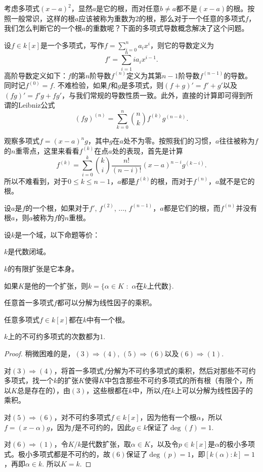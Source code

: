 考虑多项式$(x-a)^2$，显然$a$是它的根，而对任意$b\neq a$都不是$(x-a)$的根。按照一般常识，这样的根$a$应该被称为重数为$2$的根，那么对于一个任意的多项式$f$，我们怎么判断它的一个根$a$的重数呢？下面的多项式导数概念解决了这个问题。

\para 设$f\in k[x]$是一个多项式，写作$f=\sum_{i=0}^n a_ix^i$，则它的导数定义为
\[
	f'=\sum_{i=1}^n ia_ix^{i-1}.
\]
高阶导数定义如下：$f$的第$n$阶导数$f^{(n)}$定义为其第$n-1$阶导数$f^{(n-1)}$的导数。同时记$f^{(0)}=f$. 不难检验，如果$f$和$g$是多项式，则$(f+g)'=f'+g'$以及$(fg)'=f'g+fg'$，与我们常规的导数性质一致。此外，直接的计算即可得到所谓的Leibniz公式
\[
	(fg)^{(n)}=\sum_{k=0}^n {n \choose k}f^{(k)}g^{(n-k)}.
\]

观察多项式$f=(x-a)^ng$，其中$g$在$a$处不为零。按照我们的习惯，$a$往往被称为$f$的$n$重零点，这里来看看$f^{(k)}$在点$a$处的表现，首先是计算
\[
	f^{(k)}=\sum_{i=0}^k {k \choose i} \frac{n!}{(n-i)!}(x-a)^{n-i}g^{(k-i)}.
\]
所以不难看到，对于$0\leq k\leq n-1$，$a$都是$f^{(k)}$的根，而对于$f^{(n)}$，$a$就不是它的根。

\begin{para}
设$a$是$f$的一个根，如果对于$f'$, $f^{(2)}$, $\dots$, $f^{(n-1)}$，$a$都是它们的根，而$f^{(n)}$并没有根$a$，则$a$被称为$f$的$n$重根。
\end{para}

\begin{thm}设$k$是一个域，以下命题等价：
\begin{compactenum}[~~~(1)]
\item $k$是代数闭域。
\item $k$的有限扩张是它本身。
\item 如果$K$是他的一个扩张，则$k=\{\alpha\in K$ $:$ $\alpha$在$k$上代数$\}$.
\item 任意首一多项式$f$都可以分解为线性因子的乘积。
\item 任意多项式$f\in k[x]$都在$k$中有一个根。
\item $k$上的不可约多项式的次数都为$1$.
\end{compactenum}
\end{thm}

\begin{proof}
	稍微困难的是，$(3)\Rightarrow (4)$, $(5)\Rightarrow (6)$以及$(6)\Rightarrow (1)$.

	对$(3)\Rightarrow (4)$，将首一多项式$f$分解为不可约多项式的乘积，然后对那些不可约多项式，找一个$k$的扩张$K$使得$K$中包含那些不可约多项式的所有根（有限个，所以$K$总是存在的），由$(3)$，这些根都在$k$中，所以$f$在$k$上可以分解为线性因子的乘积。

	对$(5)\Rightarrow (6)$，对不可约多项式$f\in k[x]$，因为他有一个根$\alpha$，所以$f=(x-\alpha)g$，因为$f$是不可约的，因此$g\in k$保证了$\deg(f)=1$.

	对$(6)\Rightarrow (1)$，令$K/k$是代数扩张，取$\alpha\in K$，以及令$p\in k[x]$是$\alpha$的极小多项式。极小多项式都是不可约的，故$(6)$保证了$\deg(p)=1$，即$[k(\alpha):k]=1$，再即$\alpha\in k$. 所以$K=k$.
\end{proof}

